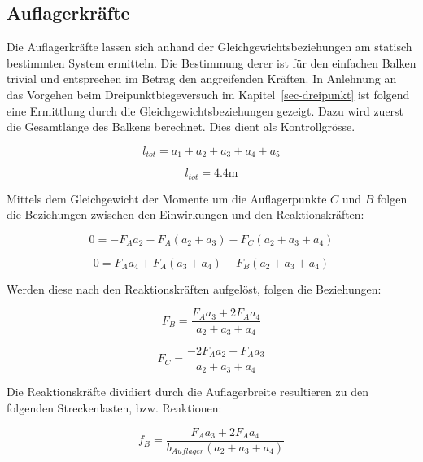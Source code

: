 \documentclass[
  12pt,
  letterpaper,
  egregdoesnotlikesansseriftitles]{scrreprt}
\begin{document}
\hypertarget{auflagerkruxe4fte-1}{%
\subsection{Auflagerkräfte}\label{auflagerkruxe4fte-1}}

Die Auflagerkräfte lassen sich anhand der Gleichgewichtsbeziehungen am
statisch bestimmten System ermitteln. Die Bestimmung derer ist für den
einfachen Balken trivial und entsprechen im Betrag den angreifenden
Kräften. In Anlehnung an das Vorgehen beim Dreipunktbiegeversuch im
Kapitel~\ref{sec-dreipunkt} ist folgend eine Ermittlung durch die
Gleichgewichtsbeziehungen gezeigt. Dazu wird zuerst die Gesamtlänge des
Balkens berechnet. Dies dient als Kontrollgrösse.

\begin{equation}l_{tot} = a_{1} + a_{2} + a_{3} + a_{4} + a_{5}\end{equation}

\begin{equation}l_{tot} = 4.4 \text{m}\end{equation}

Mittels dem Gleichgewicht der Momente um die Auflagerpunkte \(C\) und
\(B\) folgen die Beziehungen zwischen den Einwirkungen und den
Reaktionskräften:

\begin{equation}0 = - F_{A} a_{2} - F_{A} \left(a_{2} + a_{3}\right) - F_{C} \left(a_{2} + a_{3} + a_{4}\right)\end{equation}

\begin{equation}0 = F_{A} a_{4} + F_{A} \left(a_{3} + a_{4}\right) - F_{B} \left(a_{2} + a_{3} + a_{4}\right)\end{equation}

Werden diese nach den Reaktionskräften aufgelöst, folgen die
Beziehungen:

\begin{equation}F_{B} = \frac{F_{A} a_{3} + 2 F_{A} a_{4}}{a_{2} + a_{3} + a_{4}}\end{equation}

\begin{equation}F_{C} = \frac{- 2 F_{A} a_{2} - F_{A} a_{3}}{a_{2} + a_{3} + a_{4}}\end{equation}

Die Reaktionskräfte dividiert durch die Auflagerbreite resultieren zu
den folgenden Streckenlasten, bzw. Reaktionen:

\begin{equation}f_{B} = \frac{F_{A} a_{3} + 2 F_{A} a_{4}}{b_{Auflager} \left(a_{2} + a_{3} + a_{4}\right)}\end{equation}
\end{document}
